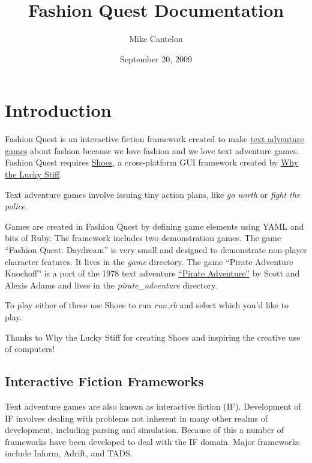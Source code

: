 \documentclass[letterpaper,10pt,english]{manual}
\title{Fashion Quest Documentation}
\date{September 20, 2009}
\author{Mike Cantelon}
\begin{document}
\maketitle
\tableofcontents
\hypertarget{--doc-index}{}


\resetcurrentobjects
\hypertarget{--doc-introduction}{}

\chapter{Introduction}

Fashion Quest is an interactive fiction framework created to make \href{http://en.wikipedia.org/wiki/Interactive\_fiction}{text adventure games} about fashion because we love fashion and we love text adventure games. Fashion Quest requires \href{http://shoes.heroku.com/}{Shoes}, a cross-platform GUI framework created by \href{http://en.wikipedia.org/wiki/Why\_the\_lucky\_stiff/}{Why the Lucky Stiff}.

Text adventure games involve issuing tiny action plans, like \emph{go north} or \emph{fight the police}.

Games are created in Fashion Quest by defining game elements using YAML and bits of Ruby. The framework includes two demonstration games. The game ``Fashion Quest: Daydream'' is very small and designed to demonstrate non-player character features. It lives in the \emph{game} directory. The game ``Pirate Adventure Knockoff'' is a port of the 1978 text adventure \href{http://en.wikipedia.org/wiki/Pirate\_Adventure}{``Pirate Adventure''} by Scott and Alexis Adams and lives in the \emph{pirate\_adventure} directory.

To play either of these use Shoes to run \emph{run.rb} and select which you’d like to play.

Thanks to Why the Lucky Stiff for creating Shoes and inspiring the creative use of computers!


\section{Interactive Fiction Frameworks}

Text adventure games are also known as interactive fiction (IF). Development of IF involves dealing with problems not inherent in many other realms of development, including parsing and simulation. Because of this a number of frameworks have been developed to deal with the IF domain. Major frameworks include Inform, Adrift, and TADS.
\end{document}
